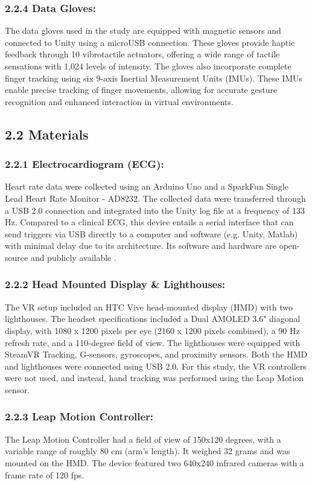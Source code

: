 \documentclass[12pt,oneside,openright]{report}
\begin{document}
\subsubsection*{2.2.4 Data Gloves:}
The data gloves used in the study are equipped with magnetic sensors and connected to Unity using a microUSB connection. These gloves provide haptic feedback through 10 vibrotactile actuators, offering a wide range of tactile sensations with 1,024 levels of intensity. The gloves also incorporate complete finger tracking using six 9-axis Inertial Measurement Units (IMUs). These IMUs enable precise tracking of finger movements, allowing for accurate gesture recognition and enhanced interaction in virtual environments.

\subsection*{2.2 Materials}
\subsubsection*{2.2.1 Electrocardiogram (ECG):}
Heart rate data were collected using an Arduino Uno and a SparkFun Single Lead Heart Rate Monitor - AD8232. The collected data were transferred through a USB 2.0 connection and integrated into the Unity log file at a frequency of 133 Hz. Compared to a clinical ECG, this device entails a serial interface that can send triggers via USB directly to a computer and software (e.g. Unity, Matlab) with minimal delay due to its architecture. Its software and hardware are open-source and publicly available \parencite{TimsECG}.

\subsubsection*{2.2.2 Head Mounted Display \& Lighthouses:}
The VR setup included an HTC Vive head-mounted display (HMD) with two lighthouses. The headset specifications included a Dual AMOLED 3.6" diagonal display, with 1080 x 1200 pixels per eye (2160 x 1200 pixels combined), a 90 Hz refresh rate, and a 110-degree field of view. The lighthouses were equipped with SteamVR Tracking, G-sensors, gyroscopes, and proximity sensors. Both the HMD and lighthouses were connected using USB 2.0. For this study, the VR controllers were not used, and instead, hand tracking was performed using the Leap Motion sensor.

\subsubsection*{2.2.3 Leap Motion Controller:}
The Leap Motion Controller had a field of view of 150x120 degrees, with a variable range of roughly 80 cm (arm's length). It weighed 32 grams and was mounted on the HMD. The device featured two 640x240 infrared cameras with a frame rate of 120 fps.
\end{document}
